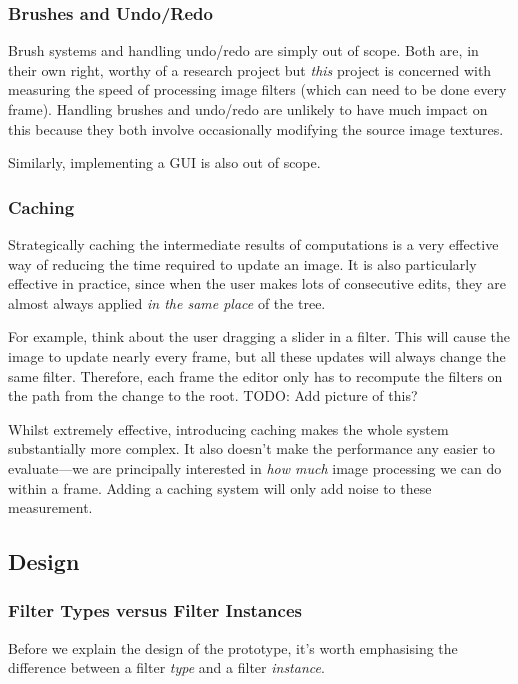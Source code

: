 \documentclass[12pt]{article}
\begin{document}
\subsubsection{Brushes and Undo/Redo}

Brush systems and handling undo/redo are simply out of scope.  Both are, in their own right, worthy
of a research project but \emph{this} project is concerned with measuring the speed of processing
image filters (which can need to be done every frame).  Handling brushes and undo/redo are unlikely
to have much impact on this because they both involve occasionally modifying the source image
textures.

Similarly, implementing a GUI is also out of scope.

\subsubsection{Caching}

Strategically caching the intermediate results of computations is a very effective way of reducing
the time required to update an image.  It is also particularly effective in practice, since when the
user makes lots of consecutive edits, they are almost always applied \emph{in the same place} of the
tree.

For example, think about the user dragging a slider in a filter.  This will cause the image to
update nearly every frame, but all these updates will always change the same filter.  Therefore,
each frame the editor only has to recompute the filters on the path from the change to the root.
TODO: Add picture of this?

Whilst extremely effective, introducing caching makes the whole system substantially more complex.
It also doesn't make the performance any easier to evaluate---we are principally interested in
\emph{how much} image processing we can do within a frame.  Adding a caching system will only add
noise to these measurement.

\subsection{Design}

\subsubsection{Filter Types versus Filter Instances}

Before we explain the design of the prototype, it's worth emphasising the difference between a
filter \emph{type} and a filter \emph{instance}.
\end{document}
